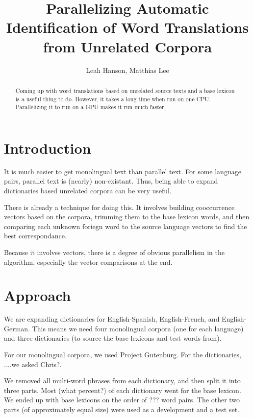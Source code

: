 \documentclass[12pt]{article}
\title{Parallelizing Automatic Identification of Word Translations from Unrelated Corpora}
\author{Leah Hanson, Matthias Lee}
\begin{document}
\maketitle
\begin{abstract}

Coming up with word translations based on unrelated source texts and a base
lexicon is a useful thing to do. However, it takes a long time when run on one
CPU. Parallelizing it to run on a GPU makes it run much faster.

\end{abstract}
\section{Introduction}

It is much easier to get monolingual text than parallel text. For some
language pairs, parallel text is (nearly) non-existant. Thus, being able to
expand dictionaries based unrelated corpora can be very useful.

There is already a technique for doing this. It involves building cooccurrence
vectors based on the corpora, trimming them to the base lexicon words, and
then comparing each unknown foriegn word to the source language vectors to
find the best correspondance.

Because it involves vectors, there is a degree of obvious parallelism in the
algorithm, especially the vector comparisons at the end.

\section{Approach}

We are expanding dictionaries for English-Spanish, English-French, and
English-German. This means we need four monolingual corpora (one for each
language) and three dictionaries (to source the base lexicons and test words
from).

For our monolingual corpora, we used Project Gutenburg. For the dictionaries,
....we asked Chris?.

We removed all multi-word phrases from each dictionary, and then split it into
three parts. Most (what percent?) of each dictionary went for the base
lexicon. We ended up with base lexicons on the order of ??? word pairs. The
other two parts (of approximately equal size) were used as a development and a
test set.
\end{document}
